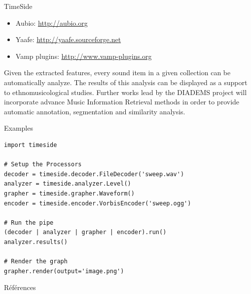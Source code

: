 \documentclass[final, hyperref, table]{beamer}
\begin{document}
\begin{frame}[containsverbatim]{}
\begin{columns}[t]
\begin{column}[T]{.49\linewidth}
\begin{block}{TimeSide}
  \begin{itemize}
  \item Aubio: \url{http://aubio.org} \cite{brossierPhD}

  \item Yaafe: \url{http://yaafe.sourceforge.net} \cite{yaafe_ISMIR2010}
  \item Vamp plugins: \url{http://www.vamp-plugins.org} \cite{vamp-plugins}
    \end{itemize}


Given the extracted features, every sound item in a given collection can be automatically analyze. The results of this analysis can be displayed as a support to ethnomusicological studies.
Further works lead by the DIADEMS project will incorporate advance Music Information Retrieval methods in order to provide automatic annotation, segmentation and similarity analysis.
  \end{block}
  \begin{block}{Examples}\small
    
    \begin{minipage}[t]{0.6\linewidth}
      \begin{lstlisting}
import timeside

# Setup the Processors
decoder = timeside.decoder.FileDecoder('sweep.wav')
analyzer = timeside.analyzer.Level()
grapher = timeside.grapher.Waveform()
encoder = timeside.encoder.VorbisEncoder('sweep.ogg')

# Run the pipe
(decoder | analyzer | grapher | encoder).run()
analyzer.results()

# Render the graph
grapher.render(output='image.png')
\end{lstlisting}
\end{minipage}

  \end{block}
\begin{block}{Références}\tiny

\vspace{-1cm}
\begin{multicols}{2}[]

\end{multicols}
  \end{block}
 \end{column}
\end{columns}
\end{frame}
\end{document}

